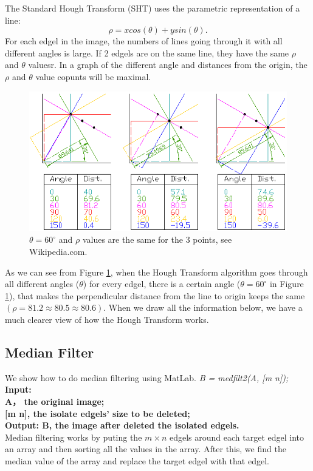 The Standard Hough Transform (SHT) uses the parametric representation of a line:
\begin{equation}
\rho = x cos(\theta) + y sin(\theta).
\label{eqn_parametric}
\end{equation}
For each edgel in the image, the numbers of lines going through it
with all different angles is large. If 2 edgels are on the same line,
they have the same $\rho$ and $\theta$ valuesr. In a graph of the
different angle and distances from the origin, the $\rho$ and $\theta$
value copunts will be maximal.
\begin{figure}[ht]
    \includegraphics[scale=0.7]{pic/SHT-example2.png}
    \caption{$\theta=60^{\circ}$ and $\rho$ values are the same for the 3 points,
    see Wikipedia.com.}
\label{fig_SHT}
\end{figure}
As we can see from Figure \ref{fig_SHT}, when the Hough Transform algorithm
goes through all different angles ($\theta$) for every edgel, there is a
certain angle ($\theta=60^{\circ}$ in Figure \ref{fig_SHT}), that makes the
perpendicular distance from the line to origin keeps the same
$(\rho = 81.2 \approx 80.5 \approx 80.6)$. When we draw all the information
below, we have a much clearer view of how the Hough Transform works.

\subsection{Median Filter}
We show how to do median filtering using MatLab.
\vspace{3mm}
\textit{B = medfilt2(A, [m n]);}\\
\newline
\textbf{Input:\\ A， the original image;}\\
\textbf{[m n], the isolate edgels’ size to be deleted;}\\
\textbf{Output: B, the image after deleted the isolated edgels.}\\
\newline
Median filtering works by puting the $m \times n$ edgels around each
target edgel into an array and then sorting all the values in the array.
After this, we find the median value of the array and replace the target edgel
with that edgel.

